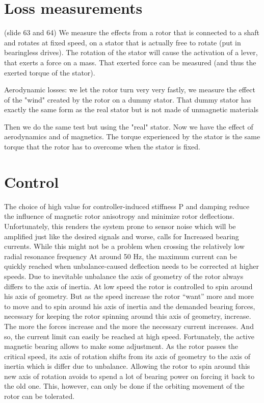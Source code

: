 \section{Loss measurements}

(slide 63 and 64) 
We measure the effects from a rotor that is connected to a shaft and rotates at fixed speed, on a stator that is actually free to rotate (put in bearingless drives). The rotation of the stator will cause the activation of a lever, that exerts a force on a mass. That exerted force can be measured (and thus the exerted torque of the stator). 

Aerodynamic losses: we let the rotor turn very very fastly, we measure the effect of the "wind" created by the rotor on a dummy stator. That dummy stator has exactly the same form as the real stator but is not made of unmagnetic materials

Then we do the same test but using the "real" stator. Now we have the effect of aerodynamics and of magnetics. The torque experienced by the stator is the same torque that the rotor has to overcome when the stator is fixed.



\section{Control}
The choice of high value for controller-induced stiffness P and damping reduce the influence of magnetic rotor anisotropy and minimize rotor deflections. Unfortunately, this renders the system prone to sensor noise which will be amplified just like the desired signals and worse, calls for Increased bearing currents. 
While this might not be a problem when crossing the relatively low radial resonance frequency 
At around 50 Hz, the maximum current can be quickly reached when unbalance-caused deflection needs to be corrected at higher speeds. 
Due to inevitable unbalance the axis of geometry of the rotor always differs to the axis of inertia. At low speed the rotor is controlled to spin around his axis of geometry. But as the speed increase the rotor “want” more and more to move and to spin around his axis of inertia and the demanded bearing forces, necessary for keeping the rotor spinning around this axis of geometry, increase. The more the forces increase and the more the necessary current increases. And so, the current limit can easily be reached at high speed.
Fortunately, the active magnetic bearing allows to make some adjustment. As the rotor passes the critical speed, its axis of rotation shifts from its axis of geometry to the axis of inertia which is differ due to unbalance. Allowing the rotor to spin around this new axis of rotation avoids to spend a lot of bearing power on forcing it back to the old one. This, however, can only be done if the orbiting movement of the rotor can be tolerated.


